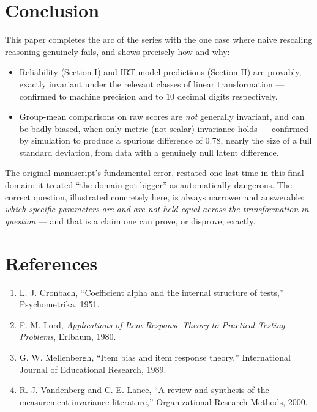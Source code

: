 \documentclass[10pt,journal,compsoc]{IEEEtran}
\begin{document}
\section{Conclusion}
This paper completes the arc of the series with the one case where naive rescaling reasoning genuinely fails, and shows precisely how and why:
\begin{itemize}
    \item Reliability (Section I) and IRT model predictions (Section II) are provably, exactly invariant under the relevant classes of linear transformation — confirmed to machine precision and to $10$ decimal digits respectively.
    \item Group-mean comparisons on raw scores are \emph{not} generally invariant, and can be badly biased, when only metric (not scalar) invariance holds — confirmed by simulation to produce a spurious difference of $0.78$, nearly the size of a full standard deviation, from data with a genuinely null latent difference.
\end{itemize}
The original manuscript's fundamental error, restated one last time in this final domain: it treated ``the domain got bigger'' as automatically dangerous. The correct question, illustrated concretely here, is always narrower and answerable: \emph{which specific parameters are and are not held equal across the transformation in question} — and that is a claim one can prove, or disprove, exactly.

\section*{References}
\begin{small}
\begin{enumerate}
    \item L. J. Cronbach, ``Coefficient alpha and the internal structure of tests,'' Psychometrika, 1951.
    \item F. M. Lord, \textit{Applications of Item Response Theory to Practical Testing Problems}, Erlbaum, 1980.
    \item G. W. Mellenbergh, ``Item bias and item response theory,'' International Journal of Educational Research, 1989.
    \item R. J. Vandenberg and C. E. Lance, ``A review and synthesis of the measurement invariance literature,'' Organizational Research Methods, 2000.
\end{enumerate}
\end{small}
\end{document}
